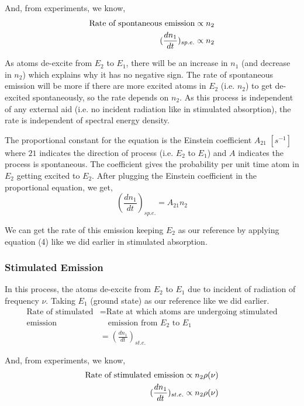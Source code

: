 \documentclass[12pt]{article}
\begin{document}
And, from experiments, we know, 
\begin{align*}
    \textnormal{Rate of spontaneous emission} \propto n_{2} \\ 
    (\frac{dn_{1}}{dt})_{sp.e.} \propto n_{2}
\end{align*}

As atoms de-excite from $E_{2}$ to $E_{1}$, there will be an increase in $n_{1}$ (and decrease in $n_{2}$) which explains why it has no negative sign. The rate of spontaneous emission will be more if there are more excited atoms in $E_{2}$ (i.e. $n_{2}$) to get de-excited spontaneously, so the rate depends on $n_{2}$. As this process is independent of any external aid (i.e. no incident radiation like in stimulated absorption), the rate is independent of spectral energy density. \vspace{.2cm}

The proportional constant for the equation is the Einstein coefficient $A_{21}$ $[s^{-1}]$ where $21$ indicates the direction of process (i.e. $E_{2}$ to $E_{1}$) and $A$ indicates the process is spontaneous. The coefficient gives the probability per unit time atom in $E_{2}$ getting excited to $E_{2}$. After plugging the Einstein coefficient in the proportional equation, we get,
\begin{equation}
    (\frac{dn_{1}}{dt})_{sp.e.} = A_{21}n_{2}
\end{equation}

We can get the rate of this emission keeping $E_{2}$ as our reference by applying equation (4) like we did earlier in stimulated absorption.

\subsubsection{Stimulated Emission}

In this process, the atoms de-excite from $E_{2}$ to $E_{1}$ due to incident of radiation of frequency $\nu$. Taking $E_{1}$ (ground state) as our reference like we did earlier.
\begin{align*}
    \text{Rate of stimulated} & = \text{Rate at which atoms are undergoing stimulated} \\
    \text{emission} & \quad \text{emission from } E_{2} \text{ to } E_{1} \\ 
    & = (\frac{dn_{1}}{dt})_{st.e.}
\end{align*}

And, from experiments, we know, 
\begin{align*}
    \textnormal{Rate of stimulated emission} \propto n_{2}\rho(\nu) \\ 
    (\frac{dn_{1}}{dt})_{st.e.} \propto n_{2}\rho(\nu)
\end{align*}
\end{document}

